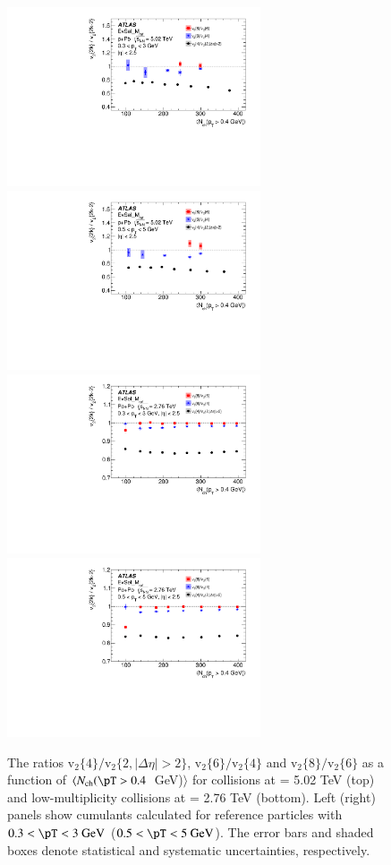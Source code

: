 \documentclass[cernpreprint,texlive=2014,txfonts,UKenglish]{latex/atlasdoc}
\begin{document}
\begin{figure}[ht!]
\begin{center}
\includegraphics[width=75mm]{fig_11a.pdf}
\includegraphics[width=75mm]{fig_11b.pdf}
\includegraphics[width=75mm]{fig_11c.pdf}
\includegraphics[width=75mm]{fig_11d.pdf}
\caption{The ratios $\mathrm{v}_2\{4\}/\mathrm{v}_2\{2,|\Delta\eta| > 2\}$, $\mathrm{v}_2\{6\}/\mathrm{v}_2\{4\}$ and $\mathrm{v}_2\{8\}/\mathrm{v}_2\{6\}$ 
as a function of $\langle N_{\mathrm{ch}}(\pT > 0.4$~GeV)$\rangle$ for \pPb collisions at \sqn= 5.02 TeV (top) and low-multiplicity \PbPb collisions at \sqn= 2.76 TeV (bottom). Left (right) panels show cumulants calculated for reference particles with $0.3 < \pT <3~\mathrm{GeV}$ ($0.5 < \pT <5~\mathrm{GeV}$). The error bars and shaded boxes denote statistical and systematic uncertainties, respectively.  }
\label{fig:v2ratios} 
\end{center}
\end{figure} 
\end{document}
